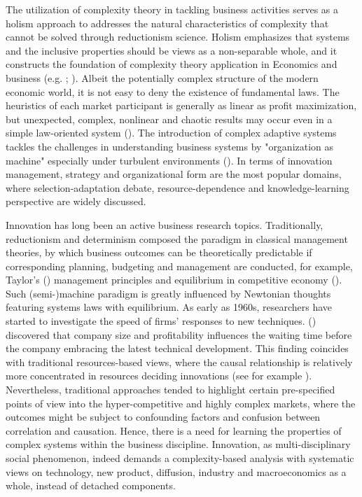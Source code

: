 \documentclass[utf8,english]{gradu3}
\begin{document}
The utilization of complexity theory in tackling business activities serves as a holism approach to addresses the natural characteristics of complexity that cannot be solved through reductionism science. Holism emphasizes that systems and the inclusive properties should be views as a non-separable whole, and it constructs the foundation of complexity theory application in Economics and business (e.g. \cite{smuts1926holism}; \cite{auyang1999foundations}). Albeit the potentially complex structure of the modern economic world, it is not easy to deny the existence of fundamental laws. The heuristics of each market participant is generally as linear as profit maximization, but unexpected, complex, nonlinear and chaotic results may occur even in a simple law-oriented system (\cite{nicolis1995introduction}). The introduction of complex adaptive systems tackles the challenges in understanding business systems by "organization as machine" especially under turbulent environments (\cite{dooley1997complex}). In terms of innovation management, strategy and organizational form are the most popular domains, where selection-adaptation debate, resource-dependence and knowledge-learning perspective are widely discussed. 

 Innovation has long been an active business research topics. Traditionally, reductionism and determinism composed the paradigm in classical management theories, by which business outcomes can be theoretically predictable if corresponding planning, budgeting and management are conducted, for example, Taylor's (\citeyear{taylor1911shop}) management principles and equilibrium in competitive economy (\cite{arrow1954existence}). Such (semi-)machine paradigm is greatly influenced by Newtonian thoughts featuring systems laws with equilibrium. As early as 1960s, researchers have started to investigate the speed of firms' responses to new techniques. \citeauthor{mansfield1963speed} (\citeyear{mansfield1963speed}) discovered that company size and profitability influences the waiting time before the company embracing the latest technical development. This finding coincides with traditional resources-based views, where the causal relationship is relatively more concentrated in resources deciding innovations (see for example \cite{wernerfelt1984resource}). Nevertheless, traditional approaches tended to highlight certain pre-specified points of view into the hyper-competitive and highly complex markets, where the outcomes might be subject to confounding factors and confusion between correlation and causation. Hence, there is a need for learning the properties of complex systems within the business discipline. Innovation, as multi-disciplinary social phenomenon, indeed demands a complexity-based analysis with systematic views on technology, new product, diffusion, industry and macroeconomics as a whole, instead of detached components.
\end{document}
